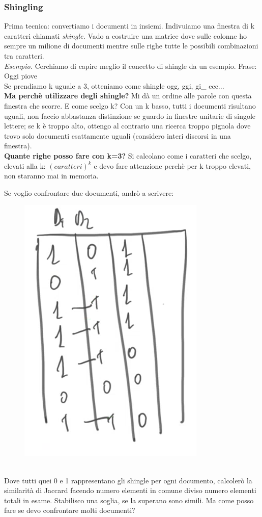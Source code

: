 \subsubsection{Shingling}
Prima tecnica: convertiamo i documenti in insiemi. Indivuiamo una finestra di k caratteri chiamati \textit{shingle.} Vado a costruire una matrice dove sulle colonne ho sempre un milione di documenti mentre sulle righe tutte le possibili combinazioni tra caratteri. 
\\
\textit{Esempio.} Cerchiamo di capire meglio il concetto di shingle da un esempio. Frase: Oggi piove
\\
Se prendiamo k uguale a 3, otteniamo come shingle ogg, ggi, gi\_ ecc... 
\\
\textbf{Ma perchè utilizzare degli shingle?} Mi dà un ordine alle parole con questa finestra che scorre. E come scelgo k? Con un k basso, tutti i documenti risultano uguali, non faccio abbastanza distinzione se guardo in finestre unitarie di singole lettere; se k è troppo alto, ottengo al contrario una ricerca troppo pignola dove trovo solo documenti esattamente uguali (considero interi discorsi in una finestra). 
\\
\textbf{Quante righe posso fare con k=3?} Si calcolano come i caratteri che scelgo, elevati alla k: $(caratteri)^k$ e devo fare attenzione perchè per k troppo elevati, non staranno mai in memoria. 

\newpage

Se voglio confrontare due documenti, andrò a scrivere: 
\\
\begin{figure}[th]
    \centering
    \includegraphics[scale=0.5]{FrequentItems/img/shingling.png}
\end{figure}
\\
Dove tutti quei 0 e 1 rappresentano gli shingle per ogni documento, calcolerò la similarità di Jaccard facendo numero elementi in comune diviso numero elementi totali in esame. Stabilisco una soglia, se la superano sono simili. Ma come posso fare se devo confrontare molti documenti? 
